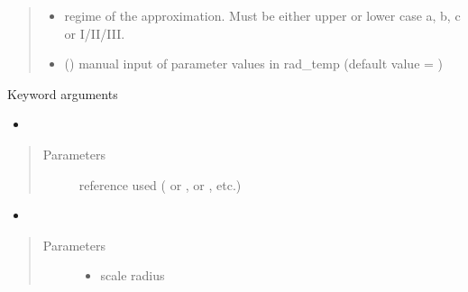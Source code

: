 \documentclass[letterpaper,10pt,english]{sphinxmanual}
\begin{document}
\begin{fulllineitems}
\begin{quote}
\begin{description}
\begin{itemize}
\item {} 
\sphinxAtStartPar
{} \textendash{} regime of the approximation. Must be either upper or lower case a, b, c or I/II/III.

\item {} 
\sphinxAtStartPar
{} () \textendash{} manual input of parameter values in rad\_temp (default value = )

\end{itemize}

\end{description}\end{quote}

\sphinxAtStartPar
Keyword arguments
\begin{itemize}
\item {} 
\sphinxAtStartPar
{}

\end{itemize}
\begin{quote}\begin{description}
\item[{Parameters}] \leavevmode
\sphinxAtStartPar
{} \textendash{} reference used ( or \sphinxcode{\sphinxupquote{\textquotesingle{}1309.2641\textquotesingle{}}},  or \sphinxcode{\sphinxupquote{\textquotesingle{}1408.0002\textquotesingle{}}}, etc.)

\end{description}\end{quote}
\begin{itemize}
\item {} 
\sphinxAtStartPar
{}

\end{itemize}
\begin{quote}\begin{description}
\item[{Parameters}] \leavevmode\begin{itemize}
\item {} 
\sphinxAtStartPar
{} \textendash{} scale radius


\end{itemize}
\end{description}
\end{quote}
\end{fulllineitems}
\end{document}
